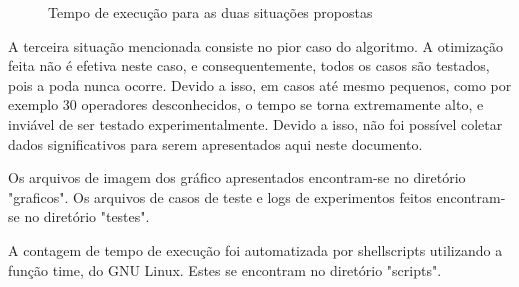 \documentclass[
12pt,
a4paper,
twoside,
brazil
]{article}
\begin{document}
	\begin{figure}[H]
		\centering
		\caption{Tempo de execução para as duas situações propostas \label{tempo_n_operacoes}}
	\end{figure}

	A terceira situação mencionada consiste no pior caso do algoritmo. A otimização feita não é efetiva neste caso, e consequentemente, todos os casos são testados, pois a poda nunca ocorre. Devido a isso, em casos até mesmo pequenos, como por exemplo 30 operadores desconhecidos, o tempo se torna extremamente alto, e inviável de ser testado experimentalmente. Devido a isso, não foi possível coletar dados significativos para serem apresentados aqui neste documento.
	
	Os arquivos de imagem dos gráfico apresentados encontram-se no diretório "graficos". Os arquivos de casos de teste e logs de experimentos feitos encontram-se no diretório "testes".
	
	A contagem de tempo de execução foi automatizada por shellscripts utilizando a função time, do GNU Linux. Estes se encontram no diretório "scripts".
	
\end{document}
